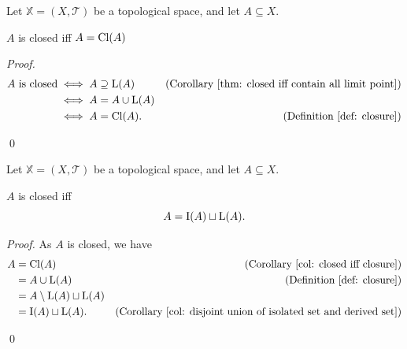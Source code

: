 \begin{corollary}
	\label{col: closed iff closure}
	Let $\mathbb X = (X, \mathcal T)$ be a topological space, and let $A \subseteq X$.
	
	$A$ is closed iff $A = \mathrm{Cl}(A)$
	
	\begin{proof}
		$$
		\begin{aligned}
			A \text{ is closed} &\iff A \supseteq \mathrm{L}(A)
				&\text{(Corollary \ref{thm: closed iff contain all limit point})}\\
			&\iff A = A \cup \mathrm{L}(A)
				\\
			&\iff A = \mathrm{Cl}(A).
				&\text{(Definition \ref{def: closure})} \\
		\end{aligned}
		$$
	
		\qed
	\end{proof}
\end{corollary}


\begin{corollary}
	\label{col: closure is disjoint union of derived and isolated set}
	Let $\mathbb X = (X, \mathcal T)$ be a topological space, and let $A \subseteq X$.
	
	$A$ is closed iff
	$$
	A = \mathrm{I}(A) \sqcup \mathrm{L}(A).
	$$
	
	\begin{proof}
		As $A$ is closed, we have
		$$
		\begin{aligned}
			A &= \mathrm{Cl} (A) 
				&\text{(Corollary \ref{col: closed iff closure})} \\
			&= A \cup \mathrm{L}(A)
				&\text{(Definition \ref{def: closure})} \\
			&= A \setminus \mathrm{L}(A) \sqcup \mathrm{L}(A)
				\\
			& = \mathrm{I} (A) \sqcup \mathrm{L}(A).
				&\text{(Corollary \ref{col: disjoint union of isolated set and derived set})}
		\end{aligned}
		$$
		
		\qed
	\end{proof}
\end{corollary}


